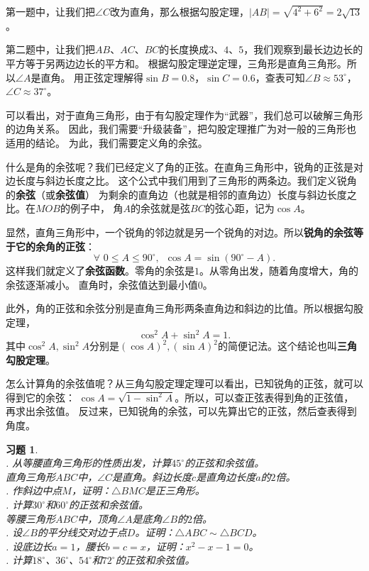 \documentclass[12pt,UTF8]{ctexbook}
\newtheorem{xt}{习题}[section]
\begin{document}
第一题中，让我们把$\angle C$改为直角，那么根据勾股定理，$|AB| = \sqrt{4^2+6^2} = 2\sqrt{13}$。

第二题中，让我们把$AB$、$AC$、$BC$的长度换成$3$、$4$、$5$，我们观察到最长边边长的平方等于另两边边长的平方和。
根据勾股定理逆定理，三角形是直角三角形。所以$\angle A$是直角。
用正弦定理解得$\sin B = 0.8$，$\sin C = 0.6$，查表可知$\angle B \approx 53^\circ$，
$\angle C \approx 37^\circ$。

可以看出，对于直角三角形，由于有勾股定理作为“武器”，我们总可以破解三角形的边角关系。
因此，我们需要“升级装备”，把勾股定理推广为对一般的三角形也适用的结论。
为此，我们需要定义角的余弦。

什么是角的余弦呢？我们已经定义了角的正弦。在直角三角形中，锐角的正弦是对边长度与斜边长度之比。
这个公式中我们用到了三角形的两条边。我们定义锐角的\textbf{余弦}（或\textbf{余弦值}）
为剩余的直角边（也就是相邻的直角边）长度与斜边长度之比。在$MOB$的例子中，
角$A$的余弦就是弦$BC$的弦心距，记为$\cos A$。

显然，直角三角形中，一个锐角的邻边就是另一个锐角的对边。所以\textbf{锐角的余弦等于它的余角的正弦}：
$$ \forall \,\, 0 \leqslant A \leqslant 90^\circ, \,\,\, \cos A = \sin (90^\circ - A). $$
这样我们就定义了\textbf{余弦函数}。零角的余弦是$1$。从零角出发，随着角度增大，角的余弦逐渐减小。
直角时，余弦值达到最小值$0$。

此外，角的正弦和余弦分别是直角三角形两条直角边和斜边的比值。所以根据勾股定理，
$$ \cos^2 A + \sin^2 A = 1.$$
其中$\cos^2 A, \sin^2 A$分别是$(\cos A)^2, (\sin A)^2$的简便记法。这个结论也叫\textbf{三角勾股定理}。

怎么计算角的余弦值呢？从三角勾股定理定理可以看出，已知锐角的正弦，就可以得到它的余弦：
$\cos A = \sqrt{1 - \sin^2 A}$。所以，可以查正弦表得到角的正弦值，再求出余弦值。
反过来，已知锐角的余弦，可以先算出它的正弦，然后查表得到角度。

\begin{xt}
    \mbox{} \\
    . 从等腰直角三角形的性质出发，计算$45^\circ$的正弦和余弦值。 \\
    直角三角形$ABC$中，$\angle C$是直角。斜边长度$c$是直角边长度$a$的$2$倍。 \\
    . 作斜边中点$M$，证明：$\triangle BMC$是正三角形。 \\
    . 计算$30^\circ$和$60^\circ$的正弦和余弦值。 \\
    等腰三角形$ABC$中，顶角$\angle A$是底角$\angle B$的$2$倍。 \\
    . 设$\angle B$的平分线交对边于点$D$。证明：$\triangle ABC \sim \triangle BCD$。 \\
    . 设底边长$a = 1$，腰长$b = c = x$，证明：$x^2 - x - 1 = 0$。 \\
    . 计算$18^\circ$、$36^\circ$、$54^\circ$和$72^\circ$的正弦和余弦值。
\end{xt}
\end{document}
